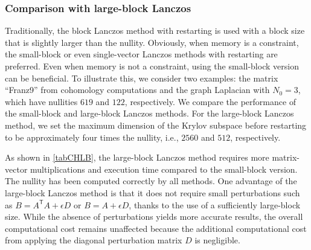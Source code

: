 \documentclass{siamart190516}
\newcommand{\ie}{i.e., }
\newcommand{\Ttran}{\mathsf{T}}
\begin{document}
\begin{table}[htbp]
{    }

    
    

\end{table}

\subsubsection{Comparison with large-block Lanczos}

Traditionally, the block Lanczos method with restarting is used with a block size  that is  slightly larger than the nullity. Obviously, when memory is a constraint, the small-block or even single-vector Lanczos methods with restarting are preferred. Even when memory is not a constraint, using the small-block version can be beneficial.
To illustrate this, we consider two examples: the matrix ``Franz9'' from cohomology computations and the graph Laplacian with $N_{0}=3$, which have nullities $619$ and $122$, respectively. We compare the performance of the small-block and large-block Lanczos methods. For the large-block Lanczos method, we set the maximum dimension of the Krylov subspace before restarting to be approximately four times the nullity, \ie $2560$ and $512$, respectively.

As shown in \cref{tabCHLB}, the large-block Lanczos method requires more matrix-vector multiplications and execution time compared to the small-block version. The nullity has been computed correctly by all methods. One advantage of the large-block Lanczos method is that it does not require small perturbations such as $B=A^{\Ttran}A+\epsilon D$ or $B=A+\epsilon D$, thanks to the use of a sufficiently large-block size. While the absence of perturbations yields more accurate results, the overall computational cost remains unaffected because the additional computational cost from applying the diagonal perturbation matrix $D$ is negligible.
\end{document}
